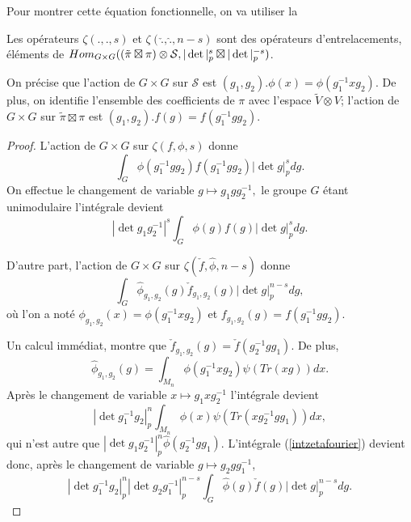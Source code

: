 Pour montrer cette équation fonctionnelle, on va utiliser la
\begin{propriete}
Les opérateurs $\zeta(., ., s)$ et $\zeta(\check{.}, \hat{.}, n-s)$ sont des opérateurs d'entrelacements, éléments de $\operatorname{\mathnormal{Hom}}_{G \times G} ( (\tilde{\pi} \boxtimes \pi) \otimes \mathcal{S}, |\det|_p^s \boxtimes |\det|_p^{-s})$.
\end{propriete}

On précise que l'action de $G \times G$ sur $\mathcal{S}$ est
$(g_1,g_2).\phi(x) = \phi(g_1^{-1} x g_2)$. De plus, on identifie l'ensemble des coefficients de $\pi$ avec l'espace $\tilde{V}\otimes V$; l'action de $G \times G$ sur $\tilde{\pi} \boxtimes \pi$ est $(g_1,g_2).f(g) = f(g_1^{-1} g g_2)$.

\begin{proof}
L'action de $G \times G$ sur $\zeta(f,\phi,s)$ donne
\begin{equation}
\int_G \phi(g_1^{-1}gg_2)f(g_1^{-1}gg_2)|\det g|_p^s dg.
\end{equation}
On effectue le changement de variable $g \mapsto g_1gg_2^{-1},$ le groupe $G$ étant unimodulaire l'intégrale devient
\begin{equation}
|\det g_1g_2^{-1}|^s\int_G \phi(g)f(g)|\det g|_p^s dg.
\end{equation}

D'autre part, l'action de $G \times G$ sur $\zeta(\check{f}, \hat{\phi}, n-s)$ donne
\begin{equation}
\label{intzetafourier}
\int_G \hat{\phi}_{g_1,g_2}(g)\check{f}_{g_1,g_2}(g)|\det g|_p^{n-s} dg,
\end{equation}
où l'on a noté $\phi_{g_1,g_2}(x) = \phi(g_1^{-1}xg_2)$ et $f_{g_1,g_2}(g) = f(g_1^{-1}gg_2).$

Un calcul immédiat, montre que $\check{f}_{g_1,g_2}(g) = \check{f}(g_2^{-1}gg_1)$. De plus,
\begin{equation}
\hat{\phi}_{g_1,g_2}(g) = \int_{M_n} \phi(g_1^{-1}xg_2) \psi(Tr(xg)) dx.
\end{equation}
Après le changement de variable $x \mapsto g_1xg_2^{-1}$ l'intégrale devient
\begin{equation}
|\det g_1^{-1}g_2|_p^n\int_{M_n} \phi(x) \psi(Tr(xg_2^{-1}gg_1)) dx,
\end{equation}
qui n'est autre que $|\det g_1g_2^{-1}|_p^n\hat{\phi}(g_2^{-1}gg_1)$.
L'intégrale (\ref{intzetafourier}) devient donc, après le changement de variable $g \mapsto g_2gg_1^{-1}$,
\begin{equation}|\det g_1^{-1}g_2|_p^n|\det g_2g_1^{-1}|_p^{n-s}\int_G \hat{\phi}(g)\check{f}(g)|\det g|_p^{n-s} dg.
\end{equation}
\end{proof}

